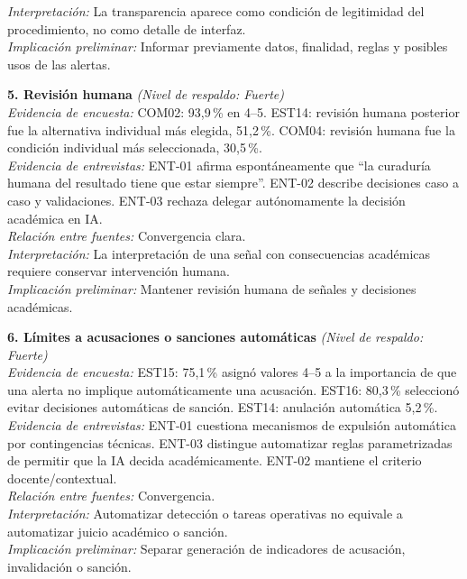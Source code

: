 \begin{center}
\begin{infobox}
\textit{Interpretación:} La transparencia aparece como condición de legitimidad del procedimiento, no como detalle de interfaz.\\
\textit{Implicación preliminar:} Informar previamente datos, finalidad, reglas y posibles usos de las alertas.
\end{infobox}
\vspace{2pt}
\begin{infobox}
\textbf{\textcolor{accent}{5. Revisión humana}} \textit{(Nivel de respaldo: Fuerte)}\\
\textit{Evidencia de encuesta:} COM02: 93,9\,\% en 4--5. EST14: revisión humana posterior fue la alternativa individual más elegida, 51,2\,\%. COM04: revisión humana fue la condición individual más seleccionada, 30,5\,\%.\\
\textit{Evidencia de entrevistas:} ENT-01 afirma espontáneamente que ``la curaduría humana del resultado tiene que estar siempre''. ENT-02 describe decisiones caso a caso y validaciones. ENT-03 rechaza delegar autónomamente la decisión académica en IA.\\
\textit{Relación entre fuentes:} Convergencia clara.\\
\textit{Interpretación:} La interpretación de una señal con consecuencias académicas requiere conservar intervención humana.\\
\textit{Implicación preliminar:} Mantener revisión humana de señales y decisiones académicas.
\end{infobox}
\vspace{2pt}
\begin{infobox}
\textbf{\textcolor{accent}{6. Límites a acusaciones o sanciones automáticas}} \textit{(Nivel de respaldo: Fuerte)}\\
\textit{Evidencia de encuesta:} EST15: 75,1\,\% asignó valores 4--5 a la importancia de que una alerta no implique automáticamente una acusación. EST16: 80,3\,\% seleccionó evitar decisiones automáticas de sanción. EST14: anulación automática 5,2\,\%.\\
\textit{Evidencia de entrevistas:} ENT-01 cuestiona mecanismos de expulsión automática por contingencias técnicas. ENT-03 distingue automatizar reglas parametrizadas de permitir que la IA decida académicamente. ENT-02 mantiene el criterio docente/contextual.\\
\textit{Relación entre fuentes:} Convergencia.\\
\textit{Interpretación:} Automatizar detección o tareas operativas no equivale a automatizar juicio académico o sanción.\\
\textit{Implicación preliminar:} Separar generación de indicadores de acusación, invalidación o sanción.
\end{infobox}
\vspace{2pt}
\end{center}
